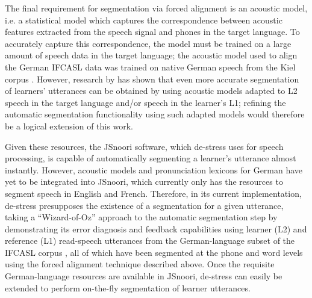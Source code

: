 	The final requirement for segmentation via forced alignment is an acoustic model, i.e. a statistical model 
	which captures the correspondence between acoustic features extracted from the speech signal and phones in the target language. 
	To accurately capture this correspondence, the model must be trained on a large amount of speech data in the target language; 
	the acoustic model used to align the German IFCASL data was trained on native German speech from the Kiel corpus \citep{Kohler1996}.
	However, research by \textcite{Bouselmi2005,Bouselmi2012} 	
	has shown that even more accurate segmentation of learners' utterances can be obtained by using acoustic models adapted to L2 speech in the target language and/or speech in the learner's L1; refining the automatic segmentation functionality using such adapted models would therefore be a logical extension of this work.
	

	
	Given these resources, the JSnoori software,
	which de-stress uses for speech processing,
	is capable of automatically segmenting a learner's utterance almost instantly. 
	However, acoustic models and pronunciation lexicons for German have yet to be integrated into JSnoori, which 
	currently only has the resources to segment 
	speech in English and French.
	 Therefore,
	 in its current implementation, de-stress
	 presupposes the existence of a segmentation for a given utterance,
	taking a ``Wizard-of-Oz'' approach to the automatic segmentation step by demonstrating its error diagnosis and feedback capabilities using learner (L2) and reference (L1) read-speech utterances from the German-language subset of the IFCASL corpus \citep{Fauth2014,Trouvain2013}, all of which have been segmented at the phone and word levels using the forced alignment technique described above.
	Once the requisite German-language resources are available in JSnoori, de-stress can easily be extended to perform on-the-fly segmentation of learner utterances. %
	
